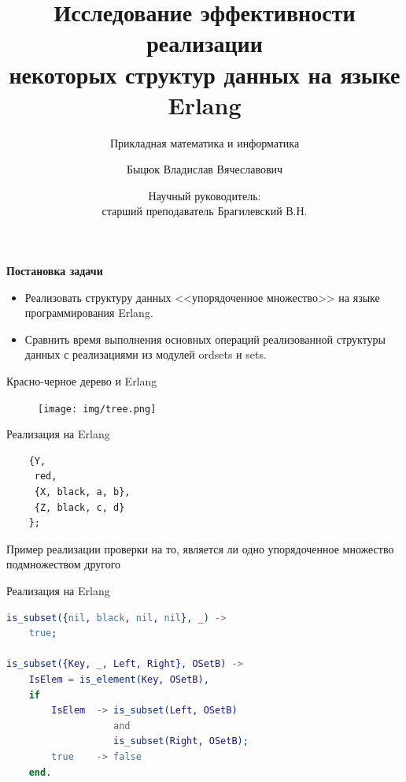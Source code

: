 \documentclass{beamer}
\title[Erlang]{Исследование эффективности реализации\\некоторых структур данных на языке Erlang}
\subtitle[ПМИ]{Прикладная математика и информатика}
\author[Быцюк В.В.]{Быцюк Владислав Вячеславович}
\date[Брагилевский В.Н.]{Научный руководитель:\\старший преподаватель Брагилевский В.Н.}
\begin{document}

	\begin{frame}
		\titlepage
	\end{frame}

	\begin{frame}{\LARGE \textbf{Постановка задачи}}
		\begin{itemize}
			\item Реализовать структуру данных <<упорядоченное множество>> на языке программирования Erlang.
			\item Сравнить время выполнения основных операций реализованной структуры данных с реализациями из модулей
			  	  ordsets и sets. 
		\end{itemize}
	\end{frame}
	
	

	\begin{frame}[fragile]{Красно-черное дерево и Erlang}
		\begin{figure}
			\texttt{[image: img/tree.png]}
		\end{figure}
		
		\begin{block}{Реализация на Erlang}
																																																												\begin{lstlisting}  
	{Y, 
	 red, 
	 {X, black, a, b}, 
	 {Z, black, c, d}
	};		   
			\end{lstlisting}
		\end{block}	
	\end{frame}
	
	\begin{frame}[fragile]{Пример реализации проверки на то, является ли одно упорядоченное множество подмножеством другого}
		\begin{block}{Реализация на Erlang}
			\begin{lstlisting}[language = erlang] 	
is_subset({nil, black, nil, nil}, _) ->
    true;	
	
is_subset({Key, _, Left, Right}, OSetB) ->
    IsElem = is_element(Key, OSetB),
    if
        IsElem  -> is_subset(Left, OSetB) 
                   and 
                   is_subset(Right, OSetB);
        true    -> false
    end.
			\end{lstlisting}
		\end{block}	
	\end{frame}
	
\end{document}
